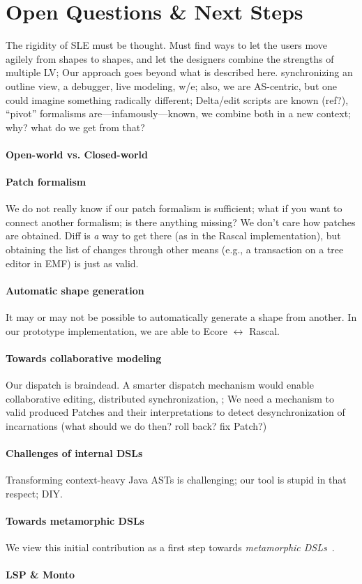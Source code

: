 \section{Open Questions \& Next Steps}
\label{sec:discussion}
The rigidity of SLE must be thought. Must find ways to let the users move agilely from shapes to shapes, and let the designers combine the strengths of multiple LV;
Our approach goes beyond what is described here. \eg synchronizing an outline view, a debugger, live modeling, w/e; also, we are AS-centric, but one could imagine something radically different;
Delta/edit scripts are known (ref?), ``pivot'' formalisms are---infamously---known, we combine both in a new context; why? what do we get from that?

\paragraph{Open-world vs. Closed-world}

\paragraph{Patch formalism}
We do not really know if our patch formalism is sufficient; what if you want to connect another formalism; is there anything missing?
We don’t care how patches are obtained. Diff is \emph{a} way to get there (as in the Rascal implementation), but obtaining the list of changes through other means (e.g., a transaction on a tree editor in EMF) is just as valid.

\paragraph{Automatic shape generation}
It may or may not be possible to automatically generate a shape from another.
In our prototype implementation, we are able to Ecore $\leftrightarrow$ Rascal.

\paragraph{Towards collaborative modeling}
Our dispatch is braindead. A smarter dispatch mechanism would enable collaborative editing, distributed synchronization, \etc;
We need a mechanism to valid produced Patches and their interpretations to detect desynchronization of incarnations (what should we do then? roll back? fix Patch?)

\paragraph{Challenges of internal DSLs}
Transforming context-heavy Java ASTs is challenging; our tool is stupid in that respect; DIY.

\paragraph{Towards metamorphic DSLs}
We view this initial contribution as a first step towards \emph{metamorphic DSLs}~\cite{acher2014metamorphic}.

\paragraph{LSP \& Monto}
\textbf{}